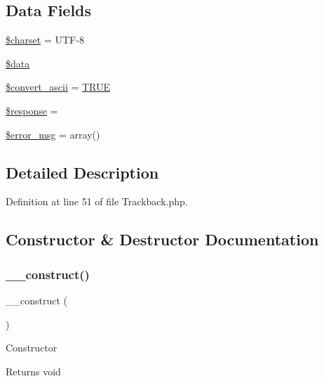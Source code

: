 \subsection*{Data Fields}
\begin{DoxyCompactItemize}
\item 
\mbox{\hyperlink{class_c_i___trackback_af10158dd74b75f1d337e83102d6b82ce}{\$charset}} = \textquotesingle{}U\+TF-\/8\textquotesingle{}
\item 
\mbox{\hyperlink{class_c_i___trackback_a6efc15b5a2314dd4b5aaa556a375c6d6}{\$data}}
\item 
\mbox{\hyperlink{class_c_i___trackback_a488490c694dfefb9578fb22e0208e008}{\$convert\+\_\+ascii}} = \mbox{\hyperlink{constants_8php_ae04a3efe6aa42044f803ee90c2277846}{T\+R\+UE}}
\item 
\mbox{\hyperlink{class_c_i___trackback_af4b6fb1bbc77ccc05f10da3b16935b99}{\$response}} = \textquotesingle{}\textquotesingle{}
\item 
\mbox{\hyperlink{class_c_i___trackback_acf910733622c1fa671b9f755c69c2ec7}{\$error\+\_\+msg}} = array()
\end{DoxyCompactItemize}


\subsection{Detailed Description}


Definition at line 51 of file Trackback.\+php.



\subsection{Constructor \& Destructor Documentation}
\mbox{\label{class_c_i___trackback_a095c5d389db211932136b53f25f39685}} 
\subsubsection{\texorpdfstring{\_\_construct()}{\_\_construct()}}
{\footnotesize\ttfamily \+\_\+\+\_\+construct (\begin{DoxyParamCaption}{ }\end{DoxyParamCaption})}

Constructor

\begin{DoxyReturn}{Returns}
void 
\end{DoxyReturn}


